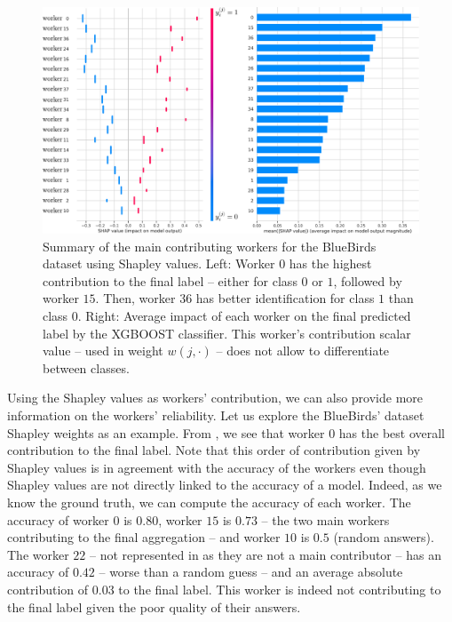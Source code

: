 \documentclass{cap2024}
\begin{document}
\begin{figure}[tbh]
  \centering
  \includegraphics[width=\textwidth]{./../summary_plot_shap_all_bluebirds.pdf}
  \caption{Summary of the main contributing workers for the BlueBirds dataset using Shapley values. Left: Worker $0$ has the highest contribution to the final label -- either for class $0$ or $1$, followed by worker $15$. Then, worker $36$ has better identification for class $1$ than class $0$. Right: Average impact of each worker on the final predicted label by the XGBOOST classifier. This worker's contribution scalar value -- used in  weight $w(j, \cdot)$ -- does not allow to differentiate between classes.}
  \label{fig:shap_bluebirds}
\end{figure}

Using the Shapley values as workers' contribution, we can also provide more information on the workers' reliability.
Let us explore the BlueBirds' dataset Shapley weights as an example.
From , we see that worker $0$ has the best overall contribution to the final label.
Note that this order of contribution given by Shapley values is in agreement with the accuracy of the workers even though Shapley values are not directly linked to the accuracy of a model.
Indeed, as we know the ground truth, we can compute the accuracy of each worker.
The accuracy of worker $0$ is $0.80$, worker $15$ is $0.73$ -- the two main workers contributing to the final aggregation -- and worker $10$ is $0.5$ (random answers).
The worker $22$ -- not represented in  as they are not a main contributor -- has an accuracy of $0.42$ -- worse than a random guess -- and an average absolute contribution of $0.03$ to the final label. This worker is indeed not contributing to the final label given the poor quality of their answers.
\end{document}
